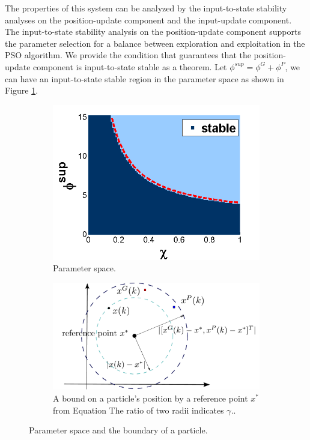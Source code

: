 \documentclass[phd]{byuprop}
\begin{document}
The properties of this system can be analyzed by the input-to-state stability analyses on the position-update component and the input-update component. 
The input-to-state stability analysis on the position-update component supports the parameter selection for a balance between exploration and exploitation in the PSO algorithm.
We provide the condition that guarantees that the position-update component is input-to-state stable as a theorem.
Let $ \phi^{sup}  = \phi^{G} + \phi^{P} $, we can have an input-to-state stable region in the parameter space as shown in Figure \ref{fig:paramSpace}.

\begin{figure}[htbp]
	\centering
	\begin{subfigure}[t]{0.4\linewidth}
		\centering
		\includegraphics[width=\textwidth]{./fig/param2.png}
		\caption{Parameter space.}
		\label{fig:paramSpace}
	\end{subfigure}  
	\begin{subfigure}[t]{0.55\linewidth}
		\centering
		\includegraphics[width=\textwidth]{./fig/boundary}
		\caption{A bound on a particle's position by a reference point $ x^{*} $ from Equation %
		The ratio of two radii indicates $ \gamma $..}
		\label{fig:boundary}
	\end{subfigure}   
	\caption{Parameter space and the boundary of a particle.}
	\label{fig:particle:param_bound}
\end{figure}
\end{document}
